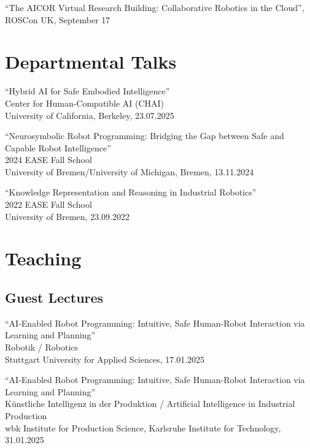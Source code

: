 \documentclass[11pt]{article} %
\begin{document}
\medskip

``The AICOR Virtual Research Building: Collaborative Robotics in the Cloud'', ROSCon UK, September 17

\section*{Departmental Talks}

``Hybrid AI for Safe Embodied Intelligence''\\
Center for Human-Compatible AI (CHAI)\\
University of California, Berkeley, 23.07.2025

\medskip

``Neurosymbolic Robot Programming: Bridging the Gap between Safe and Capable Robot Intelligence''\\
2024 EASE Fall School\\
University of Bremen/University of Michigan, Bremen, 13.11.2024

\medskip

``Knowledge Representation and Reasoning in Industrial Robotics''\\
2022 EASE Fall School\\
University of Bremen, 23.09.2022


\section*{Teaching}

\subsection*{Guest Lectures}


``AI-Enabled Robot Programming: Intuitive, Safe Human-Robot Interaction via Learning and Planning''\\
Robotik / Robotics\\
Stuttgart University for Applied Sciences, 17.01.2025

\medskip

``AI-Enabled Robot Programming: Intuitive, Safe Human-Robot Interaction via Learning and Planning''\\
Künstliche Intelligenz in der Produktion / Artificial Intelligence in Industrial Production\\
wbk Institute for Production Science, Karlsruhe Institute for Technology, 31.01.2025
\end{document}
